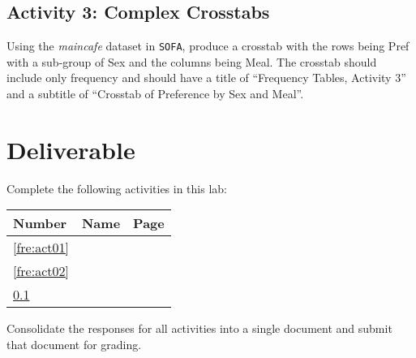 \subsection{Activity 3: Complex Crosstabs} \label{fre:act03}

Using the \textit{maincafe} dataset in \texttt{SOFA}, produce a crosstab with the rows being Pref with a sub-group of Sex and the columns being Meal. The crosstab should include only frequency and should have a title of ``Frequency Tables, Activity 3'' and a subtitle of ``Crosstab of Preference by Sex and Meal''.

\section{Deliverable}

Complete the following activities in this lab:

\begin{center}
  \begin{tabular}{lll}
    \hline 
    \textbf{Number} & \textbf{Name} & \textbf{Page} \\ 
    \hline 
    \ref{fre:act01} & \nameref{fre:act01} & \pageref{fre:act01} \\ 
    \ref{fre:act02} & \nameref{fre:act02} & \pageref{fre:act02} \\ 
    \ref{fre:act03} & \nameref{fre:act03} & \pageref{fre:act03} \\ 
    \hline 
  \end{tabular} 
\end{center}

Consolidate the responses for all activities into a single document and submit that document for grading.






